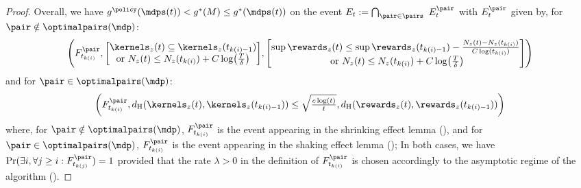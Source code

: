 \documentclass[preprint,cleveref,12pt]{colt2025}
\DeclarePairedDelimiter{\brackets}{[}{]}	%
\DeclarePairedDelimiter{\parens}{(}{)}	%
\def\model{\mdp}
\def\models{\mdps}
\def\optpairs{\optimalpairs}
\begin{document}
\begin{proof}
        Overall, we have $g^\policy(\models(t)) < g^*(M) \le g^*(\models(t))$ on the event $E_t := \bigcap_{\pair \in \pairs} E_t^\pair$ with $E_t^\pair$ given by, for $\pair \notin \optpairs(\model)$:
        \begin{equation*}
            \parens*{
                F^\pair_{t_{k(i)}}
                ,
                \brackets*{
                    \hspace{-0.5em}
                    \begin{array}{c}
                        \kernels_z(t) \subseteq \kernels_z(t_{k(i)-1}) 
                        \\
                        \text{or~}
                        N_z(t) \le N_z(t_{k(i)}) + C \log\parens*{\tfrac T\delta}
                    \end{array}
                    \hspace{-0.5em}
                }
                ,
                \brackets*{
                    \hspace{-0.5em}
                    \begin{array}{c}
                        \sup \rewards_z(t) \le \sup \rewards_z(t_{k(i)-1}) - \tfrac{N_z(t) - N_z(t_{k(i)})}{C \log(t_{k(i)})}
                        \\
                        \text{~or~}
                        N_z(t) \le N_z(t_{k(i)}) + C \log\parens*{\tfrac T\delta}
                    \end{array}
                    \hspace{-0.5em}
                }
            }
        \end{equation*}
        and for $\pair \in \optpairs(\model)$:
        \begin{equation*}
            \parens*{
                F^\pair_{t_{k(i)}}
                ,
                d_\mathrm{H}(\kernels_z(t), \kernels_z({t_{k(i)-1}})) 
                \le 
                \sqrt{\tfrac {c \log(t)}t}
                ,
                d_\mathrm{H}(\rewards_z(t), \rewards_z({t_{k(i)-1}})) 
            }
        \end{equation*}
        where, for $\pair \notin \optpairs(\model)$, $F^\pair_{t_{k(i)}}$ is the event appearing in the shrinking effect lemma (), and for $\pair \in \optpairs(\model)$, $F^\pair_{t_{k(i)}}$ is the event appearing in the shaking effect lemma (); In both cases, we have $\Pr(\exists i, \forall j \ge i: F^\pair_{t_{k(j)}}) = 1$ provided that the rate $\lambda > 0$ in the definition of $F_{t_{k(i)}}^\pair$ is chosen accordingly to the asymptotic regime of the algorithm (). 

\end{proof}
\end{document}
